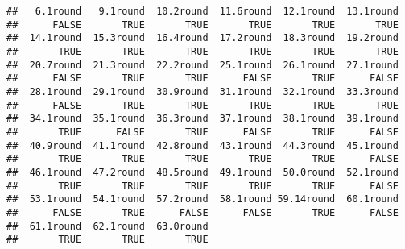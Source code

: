 \documentclass[]{article}
\begin{document}
\begin{verbatim}
##   6.1round   9.1round  10.2round  11.6round  12.1round  13.1round 
##      FALSE       TRUE       TRUE       TRUE       TRUE       TRUE 
##  14.1round  15.3round  16.4round  17.2round  18.3round  19.2round 
##       TRUE       TRUE       TRUE       TRUE       TRUE       TRUE 
##  20.7round  21.3round  22.2round  25.1round  26.1round  27.1round 
##      FALSE       TRUE       TRUE      FALSE       TRUE      FALSE 
##  28.1round  29.1round  30.9round  31.1round  32.1round  33.3round 
##      FALSE       TRUE       TRUE       TRUE       TRUE       TRUE 
##  34.1round  35.1round  36.3round  37.1round  38.1round  39.1round 
##       TRUE      FALSE       TRUE      FALSE       TRUE      FALSE 
##  40.9round  41.1round  42.8round  43.1round  44.3round  45.1round 
##       TRUE       TRUE       TRUE       TRUE       TRUE      FALSE 
##  46.1round  47.2round  48.5round  49.1round  50.0round  52.1round 
##       TRUE       TRUE       TRUE       TRUE       TRUE      FALSE 
##  53.1round  54.1round  57.2round  58.1round 59.14round  60.1round 
##      FALSE       TRUE      FALSE      FALSE       TRUE      FALSE 
##  61.1round  62.1round  63.0round 
##       TRUE       TRUE       TRUE
\end{verbatim}
\end{document}
